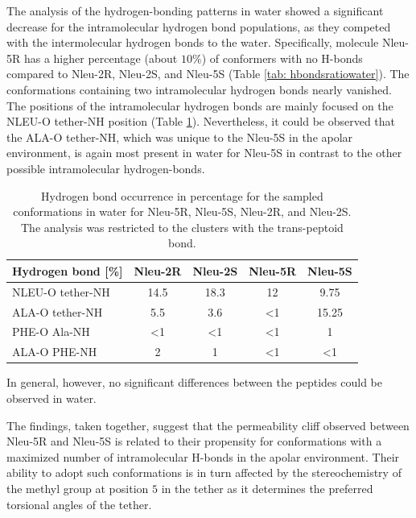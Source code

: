 The analysis of the hydrogen-bonding patterns in water showed a significant decrease for the intramolecular hydrogen bond populations, as they competed with the intermolecular hydrogen bonds to the water. Specifically, molecule Nleu-5R has a higher percentage (about $10\%$) of conformers with no H-bonds compared to Nleu-2R, Nleu-2S, and Nleu-5S (Table \ref{tab: hbondsratiowater}). The conformations containing two intramolecular hydrogen bonds nearly vanished.
The positions of the intramolecular hydrogen bonds are mainly focused on the NLEU-O tether-NH position (Table \ref{tab: SIhbondRatiosWater}).
Nevertheless, it could be observed that the ALA-O tether-NH, which was unique to the Nleu-5S in the apolar environment, is again most present in water for Nleu-5S in contrast to the other possible intramolecular hydrogen-bonds. 


\begin{table}[h!]
\centering
\caption{Hydrogen bond occurrence in percentage for the sampled conformations in
water for Nleu-5R, Nleu-5S, Nleu-2R, and Nleu-2S. The analysis was restricted to the
clusters with the trans-peptoid bond.}
\label{tab: SIhbondRatiosWater}
  \begin{adjustbox}{max width=\textwidth}
  \begin{tabular}{lcccc}
Hydrogen bond {[}\%{]} & Nleu-2R      & Nleu-2S      & Nleu-5R      & Nleu-5S      \\
\hline
NLEU-O tether-NH       & 14.5       & 18.3       &  12           & 9.75        \\
ALA-O tether-NH        & 5.5        & 3.6        & \textless{}1  & 15.25 \\
PHE-O Ala-NH           & \textless{}1 & \textless{}1 & \textless{}1  & 1 \\
ALA-O PHE-NH           & 2            & 1            & \textless{}1  & \textless{}1 \\
    \hline
\end{tabular}%
\end{adjustbox}
\end{table}

In general, however, no significant differences between the peptides could be observed in water.



\FloatBarrier

The findings, taken together, suggest that the permeability cliff observed between Nleu-5R and Nleu-5S is related to their propensity for conformations with a maximized number of intramolecular H-bonds in the apolar environment. Their ability to adopt such conformations is in turn affected by the stereochemistry of the methyl group at position $5$ in the tether as it determines the preferred torsional angles of the tether.


